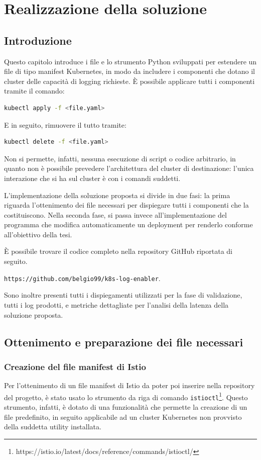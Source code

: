 \chapter{Realizzazione della soluzione}\label{chap:Realizzazione della soluzione}

\section{Introduzione}\label{chap:Introduzione}
Questo capitolo introduce i file e lo strumento Python sviluppati per estendere un file di tipo manifest Kubernetes, in modo da includere i componenti che dotano il cluster delle capacità di logging richieste.
È possibile applicare tutti i componenti tramite il comando:
\begin{lstlisting}[language=bash,label=lst:kubectl-apply,]
kubectl apply -f <file.yaml>
\end{lstlisting}
E in seguito, rimuovere il tutto tramite:
\begin{lstlisting}[language=bash]
kubectl delete -f <file.yaml>
\end{lstlisting}

Non si permette, infatti, nessuna esecuzione di script o codice arbitrario, in quanto non è possibile prevedere l'architettura del cluster di destinazione: l'unica interazione che si ha sul cluster è con i comandi suddetti.

L'implementazione della soluzione proposta si divide in due fasi: la prima riguarda l'ottenimento dei file necessari per dispiegare tutti i componenti che la costituiscono. Nella seconda fase, si passa invece all'implementazione del programma che modifica automaticamente un deployment per renderlo conforme all'obiettivo della tesi.

È possibile trovare il codice completo nella repository GitHub riportata di seguito.

\verb|https://github.com/belgio99/k8s-log-enabler|.

Sono inoltre presenti tutti i dispiegamenti utilizzati per la fase di validazione, tutti i log prodotti, e metriche dettagliate per l'analisi della latenza della soluzione proposta.


\section{Ottenimento e preparazione dei file necessari}\label{sect:Ottenimento e preparazione dei componenti}

\subsection{Creazione del file manifest di Istio}\label{subsec:Creazione del file manifest di Istio}
Per l'ottenimento di un file manifest  di Istio da poter poi inserire nella repository del progetto, è stato usato lo strumento da riga di comando \verb|istioctl|\footnote{https://istio.io/latest/docs/reference/commands/istioctl/}. Questo strumento, infatti, è dotato di una funzionalità che permette la creazione di un file predefinito, in seguito applicabile ad un cluster Kubernetes non provvisto della suddetta utility installata.

